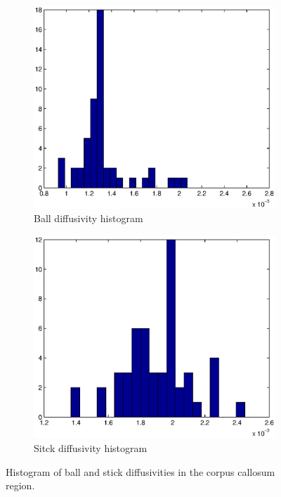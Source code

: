 \documentclass{article}
\begin{document}
\begin{figure}[H]
  \centering
  \begin{subfigure}{0.4\textwidth}
    \centering
    \includegraphics[width=\textwidth]{figures/cc_ball_diffus.eps}
    \caption{Ball diffusivity histogram}
  \end{subfigure}
  \begin{subfigure}{0.4\textwidth}
    \centering
    \includegraphics[width=\textwidth]{figures/cc_stick_diffus.eps}
    \caption{Sitck diffusivity histogram}
  \end{subfigure}
  \caption{Histogram of ball and stick diffusivities in the corpus callosum region.}
  \label{fig:diffusivities}
\end{figure}
\end{document}
